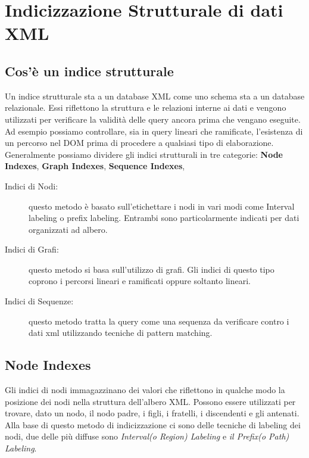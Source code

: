 \documentclass[12pt,a4paper,openright,twoside]{report}
\theoremstyle{definition}
\begin{document}
\newpage
\section{Indicizzazione Strutturale di dati XML}
\subsection{Cos'è un indice strutturale}
Un indice strutturale sta a un database XML come uno schema sta a un database relazionale. Essi riflettono la struttura e le relazioni interne ai dati e vengono utilizzati per verificare la validità delle query ancora prima che vengano eseguite. Ad esempio possiamo controllare, sia in query lineari che ramificate, l'esistenza di un percorso nel DOM prima di procedere a qualsiasi tipo di elaborazione.\\
Generalmente possiamo dividere gli indici strutturali in tre categorie: \textbf{Node Indexes}, \textbf{Graph Indexes}, \textbf{Sequence Indexes},
\begin{description}
\item[Indici di Nodi:] questo metodo è basato sull'etichettare i nodi in vari modi come Interval labeling o prefix labeling. Entrambi sono particolarmente indicati per dati organizzati ad albero.
\item[Indici di Grafi:] questo metodo si basa sull'utilizzo di grafi. Gli indici di questo tipo coprono i percorsi lineari e ramificati oppure soltanto lineari.
\item[Indici di Sequenze:] questo metodo tratta la query come una sequenza da verificare contro i dati xml utilizzando tecniche di pattern matching.
\end{description}

\subsection{Node Indexes}
Gli indici di nodi immagazzinano dei valori che riflettono in qualche modo la posizione dei nodi nella struttura dell'albero XML. Possono essere utilizzati per trovare, dato un nodo, il nodo padre, i figli, i fratelli, i discendenti e gli antenati. Alla base di questo metodo di indicizzazione ci sono delle tecniche di labeling dei nodi, due delle più diffuse sono \emph{Interval(o Region) Labeling} e \emph{il Prefix(o Path) Labeling}.
\end{document}
